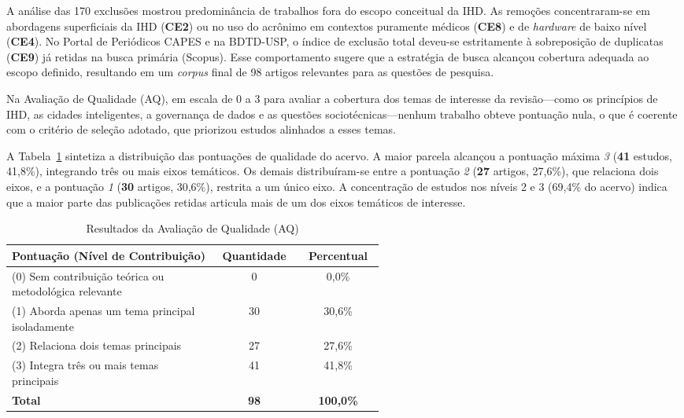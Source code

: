 \documentclass[12pt]{article}
\begin{document}
A análise das 170 exclusões mostrou predominância de trabalhos fora do escopo conceitual da IHD. As remoções concentraram-se em abordagens superficiais da IHD (\textbf{CE2}) ou no uso do acrônimo em contextos puramente médicos (\textbf{CE8}) e de \textit{hardware} de baixo nível (\textbf{CE4}). No Portal de Periódicos CAPES e na BDTD-USP, o índice de exclusão total deveu-se estritamente à sobreposição de duplicatas (\textbf{CE9}) já retidas na busca primária (Scopus). Esse comportamento sugere que a estratégia de busca alcançou cobertura adequada ao escopo definido, resultando em um \textit{corpus} final de 98 artigos relevantes para as questões de pesquisa.

Na Avaliação de Qualidade (AQ), em escala de 0 a 3 para avaliar a cobertura dos temas de interesse da revisão---como os princípios de IHD, as cidades inteligentes, a governança de dados e as questões sociotécnicas---nenhum trabalho obteve pontuação nula, o que é coerente com o critério de seleção adotado, que priorizou estudos alinhados a esses temas.

A Tabela~\ref{tab:resumo_qualidade} sintetiza a distribuição das pontuações de qualidade do acervo. A maior parcela alcançou a pontuação máxima \emph{3} (\textbf{41} estudos, 41,8\%), integrando três ou mais eixos temáticos. Os demais distribuíram-se entre a pontuação \emph{2} (\textbf{27} artigos, 27,6\%), que relaciona dois eixos, e a pontuação \emph{1} (\textbf{30} artigos, 30,6\%), restrita a um único eixo. A concentração de estudos nos níveis 2 e 3 (69,4\% do acervo) indica que a maior parte das publicações retidas articula mais de um dos eixos temáticos de interesse.

\begin{table}[H]
\centering
\caption{Resultados da Avaliação de Qualidade (AQ)}
\label{tab:resumo_qualidade}
\small
\begin{tabular}{p{0.55\linewidth} c c}
\hline
\textbf{Pontuação (Nível de Contribuição)} & \textbf{Quantidade} & \textbf{Percentual} \\
\hline
(0) Sem contribuição teórica ou metodológica relevante & 0 & 0,0\% \\
(1) Aborda apenas um tema principal isoladamente & 30 & 30,6\% \\
(2) Relaciona dois temas principais & 27 & 27,6\% \\
(3) Integra três ou mais temas principais  & 41 & 41,8\% \\
\hline
\textbf{Total} & \textbf{98} & \textbf{100,0\%} \\
\hline
\end{tabular}
\end{table}
\end{document}
